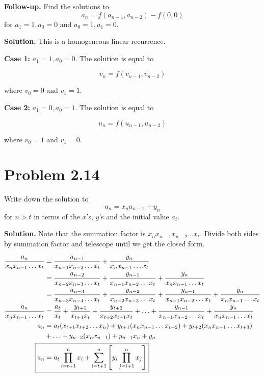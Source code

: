 \documentclass[a4paper, 11pt]{article}
\begin{document}
\textbf{Follow-up.} Find the solutions to
\begin{equation*}
a_n = f(a_{n-1}, a_{n-2}) - f(0, 0)
\end{equation*}
for $a_1=1, a_0=0$ and $a_0=1, a_1=0$.

\textbf{Solution.} This is a homogeneous linear recurrence.

\textbf{Case 1:} $a_1=1, a_0=0$. The solution is equal to

\begin{equation*}
v_n = f(v_{n-1}, v_{n-2})
\end{equation*}

where $v_0=0$ and $v_1=1$.

\textbf{Case 2:} $a_1=0, a_0=1$. The solution is equal to

\begin{equation*}
u_n = f(u_{n-1}, u_{n-2})
\end{equation*}

where $v_0=1$ and $v_1=0$.

\section{Problem 2.14} Write down the solution to
\begin{equation*}
a_n = x_n a_{n-1} + y_n
\end{equation*}
for $n>t$ in terms of the $x$'s, $y$'s and the initial value $a_t$.

\textbf{Solution.} Note that the summation factor is $x_n x_{n-1} x_{n-2} \ldots x_t$.
Divide both sides by summation factor and telescope until we get the closed form.

\begin{align*}
\frac{a_n}{x_n x_{n-1} \ldots x_t} &= \frac{a_{n-1}}{x_{n-1} x_{n-2} \ldots x_t} + \frac{y_n}{x_n x_{n-1} \ldots x_t}\\
&= \frac{a_{n-2}}{x_{n-2} x_{n-3} \ldots x_t} + \frac{y_{n-1}}{x_{n-1} x_{n-2} \ldots x_t} + \frac{y_n}{x_n x_{n-1} \ldots x_t}\\
&= \frac{a_{n-3}}{x_{n-3} x_{n-4} \ldots x_t} + \frac{y_{n-2}}{x_{n-2} x_{n-3} \ldots x_t} + \frac{y_{n-1}}{x_{n-1} x_{n-2} \ldots x_t} + \frac{y_n}{x_n x_{n-1} \ldots x_t}\\
\frac{a_n}{x_n x_{n-1} \ldots x_t}&= \frac{a_t}{x_t} + \frac{y_{t+1}}{x_{t+1} x_t} + \frac{y_{t+2}}{x_{t+2} x_{t+1} x_t} + \ldots + \frac{y_{n-1}}{x_{n-1} x_{n-2} \ldots x_t} + \frac{y_n}{x_n x_{n-1} \ldots x_t}\\
a_n &= a_t(x_{t+1} x_{t+2} \ldots x_n) + y_{t+1}(x_n x_{n-1} \ldots x_{t+2}) + y_{t+2}(x_n x_{n-1} \ldots x_{t+3})\\ &+ \ldots + y_{n-2}(x_n x_{n-1}) + y_{n-1} x_n + y_n\\
\Aboxed{a_n &= a_t \prod_{i=t+1}^{n} x_i + \sum_{i=t+1}^{n} \left[y_i \prod_{j=i+1}^{n} x_j\right]}
\end{align*}
\end{document}
